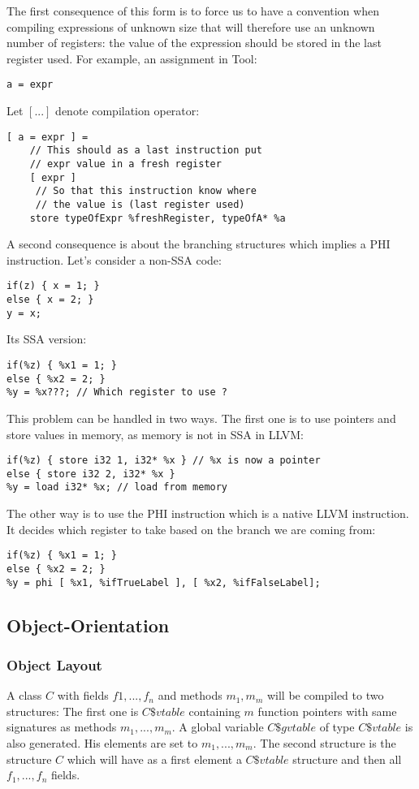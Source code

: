 The first consequence of this form is to force us to have a convention when compiling expressions of unknown size that will therefore use an unknown number of registers: the value of the expression should be stored in the last register used. For example, an assignment in Tool:
\begin{lstlisting}
a = expr
\end{lstlisting}

Let $[ ... ]$ denote compilation operator:
\begin{lstlisting}
[ a = expr ] = 
    // This should as a last instruction put
    // expr value in a fresh register
    [ expr ]
     // So that this instruction know where
     // the value is (last register used)
    store typeOfExpr %freshRegister, typeOfA* %a
\end{lstlisting}

A second consequence is about the branching structures which implies a PHI instruction. Let's consider a non-SSA code:
\begin{lstlisting}
if(z) { x = 1; } 
else { x = 2; }
y = x;
\end{lstlisting}

Its SSA version:
\begin{lstlisting}
if(%z) { %x1 = 1; } 
else { %x2 = 2; }
%y = %x???; // Which register to use ?
\end{lstlisting}

This problem can be handled in two ways. The first one is to use pointers and store values in memory, as memory is not in SSA in LLVM:
\begin{lstlisting}
if(%z) { store i32 1, i32* %x } // %x is now a pointer
else { store i32 2, i32* %x }
%y = load i32* %x; // load from memory
\end{lstlisting}

The other way is to use the PHI instruction which is a native LLVM instruction. It decides which register to take based on the branch we are coming from:
\begin{lstlisting}
if(%z) { %x1 = 1; } 
else { %x2 = 2; }
%y = phi [ %x1, %ifTrueLabel ], [ %x2, %ifFalseLabel];
\end{lstlisting}

\subsection{Object-Orientation}
\subsubsection{Object Layout}
A class $C$ with fields $f1, ..., f_n$ and methods $m_1, m_m$ will be compiled to two structures: The first one is $C\$vtable$ containing $m$ function pointers with same signatures as methods $m_1, ..., m_m$. A global variable $C\$gvtable$ of type $C\$vtable$ is also generated. His elements are set to $m_1, ..., m_m$. The second structure is the structure $C$ which will have as a first element a $C\$vtable$ structure and then all $f_1, ..., f_n$ fields.

